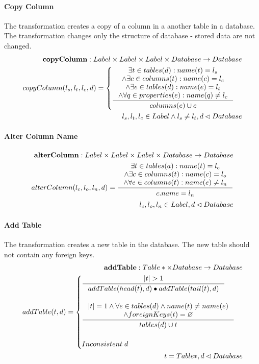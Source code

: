 \documentclass[11pt]{article}
\begin{document}
\paragraph{Copy Column} The transformation creates a copy of a column in a another table in a database. The transformation changes only the structure of database - stored data are not changed.
\begin{align*}
	\mathbf{copyColumn} : Label \times Label \times Label \times Database \rightarrow Database \\
	copyColumn(l_s, l_t, l_c, d) = \begin{cases}
 		\inference{\exists t \in tables(d) : name(t) = l_s \\ \wedge \exists c \in columns(t) : name(c) = l_c \\ \wedge \exists e \in tables(d) : name(e) = l_t  \\ \wedge \forall q \in properties(e) : name(q) \neq l_c}{columns(e) \cup c} 
	\end{cases} \\
	l_s,l_t,l_c \in Label \wedge l_s \neq l_t,d \lhd Database
\end{align*}

\paragraph{Alter Column Name}
\begin{align*}
\mathbf{alterColumn} : Label \times Label \times Label \times Database \rightarrow Database \\
	alterColumn(l_c, l_o, l_n, d) =
 \inference{\exists t \in tables(a) : name(t) = l_c \\ \wedge \exists c \in columns(t) : name(c) = l_o \\ \wedge \forall e \in columns(t) : name(e) \neq l_n}{\begin{gathered}
c.name = l_n 
\end{gathered}}
 \\
l_c, l_o, l_n \in Label, d \lhd Database
\end{align*}

\paragraph{Add Table} The transformation creates a new table in the database. The new table should not contain any foreign keys.
\begin{align*}
	\mathbf{addTable} : Table* \times Database \rightarrow Database \\ 
	addTable(t, d) = \begin{cases}
		\inference{|t| > 1}{addTable(head(t),d) \bullet addTable(tail(t), d)}
\\ \\	
		\inference{|t| = 1 \wedge \forall e \in tables(d) \wedge name(t) \neq name(e) \\ \wedge foreignKeys(t) = \varnothing }{tables(d) \cup t}
\\ \\
		Inconsistent \;d 
	 \end{cases}\\ 
	t = Table*, d \lhd Database
\end{align*}
\end{document}

